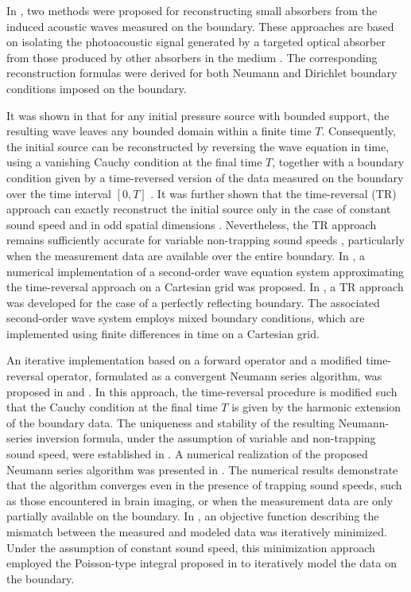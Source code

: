 \documentclass[11pt,reqno]{amsart}
\theoremstyle{remark}
\begin{document}
In \cite{Ammari2010}, two methods were proposed for reconstructing small absorbers from the induced acoustic waves measured on the boundary. These approaches are based on isolating the photoacoustic signal generated by a targeted optical absorber from those produced by other absorbers in the medium \cite{Ammari2010}. The corresponding reconstruction formulas were derived for both Neumann and Dirichlet boundary conditions imposed on the boundary.

It was shown in \cite{Hristova2008} that for any initial pressure source with bounded support, the resulting wave leaves any bounded domain within a finite time \(T\). Consequently, the initial source can be reconstructed by reversing the wave equation in time, using a vanishing Cauchy condition at the final time \(T\), together with a boundary condition given by a time-reversed version of the data measured on the boundary over the time interval \([0,T]\) \cite{Hristova2008}. It was further shown that the time-reversal (TR) approach can exactly reconstruct the initial source only in the case of constant sound speed and in odd spatial dimensions \cite{Finch2004}. Nevertheless, the TR approach remains sufficiently accurate for variable non-trapping sound speeds \cite{Hristova2008}, particularly when the measurement data are available over the entire boundary. In \cite{Burgholzer2007a}, a numerical implementation of a second-order wave equation system approximating the time-reversal approach on a Cartesian grid was proposed. In \cite{Nguyen2016}, a TR approach was developed for the case of a perfectly reflecting boundary. The associated second-order wave system employs mixed boundary conditions, which are implemented using finite differences in time on a Cartesian grid.

An iterative implementation based on a forward operator and a modified time-reversal operator, formulated as a convergent Neumann series algorithm, was proposed in \cite{Stefanov2009} and \cite{Qian2011}. In this approach, the time-reversal procedure is modified such that the Cauchy condition at the final time \(T\) is given by the harmonic extension of the boundary data. The uniqueness and stability of the resulting Neumann-series inversion formula, under the assumption of variable and non-trapping sound speed, were established in \cite{Stefanov2009}. A numerical realization of the proposed Neumann series algorithm was presented in \cite{Qian2011}. The numerical results demonstrate that the algorithm converges even in the presence of trapping sound speeds, such as those encountered in brain imaging, or when the measurement data are only partially available on the boundary. In \cite{DeanBen2012}, an objective function describing the mismatch between the measured and modeled data was iteratively minimized. Under the assumption of constant sound speed, this minimization approach employed the Poisson-type integral proposed in \cite{Kruger1995} to iteratively model the data on the boundary.
\end{document}
